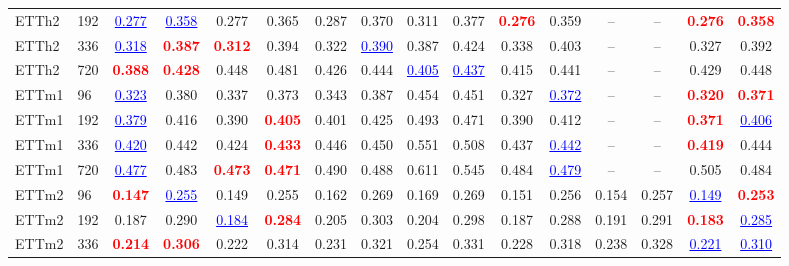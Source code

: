 \begin{table}[h]
\begin{center}
\begin{tabular}{ll|cc|cc|cc|cc|cc|cc|cc}
    ETTh2 & 192 & \textcolor{blue}{\underline{0.277}} & \textcolor{blue}{\underline{0.358}} & 0.277 & 0.365 & 0.287 & 0.370 & 0.311 & 0.377 & \textcolor{red}{\textbf{0.276}} & 0.359 & -- & -- & \textcolor{red}{\textbf{0.276}} & \textcolor{red}{\textbf{0.358}} \\
    ETTh2 & 336 & \textcolor{blue}{\underline{0.318}} & \textcolor{red}{\textbf{0.387}} & \textcolor{red}{\textbf{0.312}} & 0.394 & 0.322 & \textcolor{blue}{\underline{0.390}} & 0.387 & 0.424 & 0.338 & 0.403 & -- & -- & 0.327 & 0.392 \\
    ETTh2 & 720 & \textcolor{red}{\textbf{0.388}} & \textcolor{red}{\textbf{0.428}} & 0.448 & 0.481 & 0.426 & 0.444 & \textcolor{blue}{\underline{0.405}} & \textcolor{blue}{\underline{0.437}} & 0.415 & 0.441 & -- & -- & 0.429 & 0.448 \\
    \midrule
    ETTm1 & 96  & \textcolor{blue}{\underline{0.323}} & 0.380 & 0.337 & 0.373 & 0.343 & 0.387 & 0.454 & 0.451 & 0.327 & \textcolor{blue}{\underline{0.372}} & -- & -- & \textcolor{red}{\textbf{0.320}} & \textcolor{red}{\textbf{0.371}} \\
    ETTm1 & 192 & \textcolor{blue}{\underline{0.379}} & 0.416 & 0.390 & \textcolor{red}{\textbf{0.405}} & 0.401 & 0.425 & 0.493 & 0.471 & 0.390 & 0.412 & -- & -- & \textcolor{red}{\textbf{0.371}} & \textcolor{blue}{\underline{0.406}} \\
    ETTm1 & 336 & \textcolor{blue}{\underline{0.420}} & 0.442 & 0.424 & \textcolor{red}{\textbf{0.433}} & 0.446 & 0.450 & 0.551 & 0.508 & 0.437 & \textcolor{blue}{\underline{0.442}} & -- & -- & \textcolor{red}{\textbf{0.419}} & 0.444 \\
    ETTm1 & 720 & \textcolor{blue}{\underline{0.477}} & 0.483 & \textcolor{red}{\textbf{0.473}} & \textcolor{red}{\textbf{0.471}} & 0.490 & 0.488 & 0.611 & 0.545 & 0.484 & \textcolor{blue}{\underline{0.479}} & -- & -- & 0.505 & 0.484 \\
    \midrule
    ETTm2 & 96  & \textcolor{red}{\textbf{0.147}} & \textcolor{blue}{\underline{0.255}} & 0.149 & 0.255 & 0.162 & 0.269 & 0.169 & 0.269 & 0.151 & 0.256 & 0.154 & 0.257 & \textcolor{blue}{\underline{0.149}} & \textcolor{red}{\textbf{0.253}} \\
    ETTm2 & 192 & 0.187 & 0.290 & \textcolor{blue}{\underline{0.184}} & \textcolor{red}{\textbf{0.284}} & 0.205 & 0.303 & 0.204 & 0.298 & 0.187 & 0.288 & 0.191 & 0.291 & \textcolor{red}{\textbf{0.183}} & \textcolor{blue}{\underline{0.285}} \\
    ETTm2 & 336 & \textcolor{red}{\textbf{0.214}} & \textcolor{red}{\textbf{0.306}} & 0.222 & 0.314 & 0.231 & 0.321 & 0.254 & 0.331 & 0.228 & 0.318 & 0.238 & 0.328 & \textcolor{blue}{\underline{0.221}} & \textcolor{blue}{\underline{0.310}} \\

\end{tabular}
\end{center}
\end{table}

